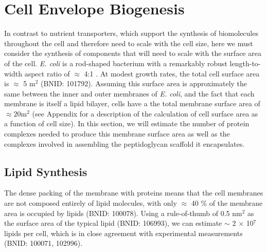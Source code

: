 \section{Cell Envelope Biogenesis}
In contrast to nutrient transporters, which support the synthesis of biomolecules
throughout the cell and therefore need to scale with the cell size, here we must
consider the synthesis of components that will need to scale with the surface
area of the cell. \textit{E. coli} is a rod-shaped bacterium with a remarkably robust length-to-width aspect
ratio of $\approx$ 4:1 \citep{harris2018, ojkic2019}. At modest growth rates,
the total cell surface area is $\approx$ 5 \textmu m$^2$ (BNID: 101792). Assuming this surface area is approximately the same between
the inner and outer membranes of \textit{E. coli}, and the fact that each
membrane is itself a lipid bilayer, cells have a the total membrane surface area
of $\approx 20$\textmu m$^2$ (see  Appendix  for a
description of the calculation of cell surface area as a function of cell size).
In this section, we will estimate the number of protein complexes needed to
produce this membrane surface area as well as the complexes involved in
assembling the peptidoglycan scaffold it encapsulates.

\subsection{Lipid Synthesis}
The dense packing of the membrane with proteins means that the cell membranes
are not composed entirely of lipid molecules, with only $\approx$ 40 \% of the
membrane area is occupied by lipids (BNID: 100078). Using a rule-of-thumb of 0.5
nm$^2$ as the surface area of the typical lipid (BNID: 106993), we can
estimate $\sim$ 2 $\times$ 10$^7$ lipids per cell, which is in close
agreement with experimental measurements (BNID: 100071, 102996).

